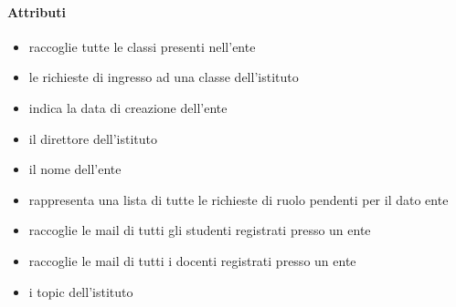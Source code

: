 \paragraph{Attributi}
\begin{itemize}
\item {}
\newline
raccoglie tutte le classi presenti nell'ente
\item {}
\newline
le richieste di ingresso ad una classe dell'istituto
\item {}
\newline
indica la data di creazione dell'ente
\item {}
\newline
il direttore dell'istituto
\item {}
\newline
il nome dell'ente
\item {}
\newline
rappresenta una lista di tutte le richieste di ruolo pendenti per il dato ente
\item {}
\newline
raccoglie le mail di tutti gli studenti registrati presso un ente
\item {}
\newline
raccoglie le mail di tutti i docenti registrati presso un ente
\item {}
\newline
i topic dell'istituto
\end{itemize}
